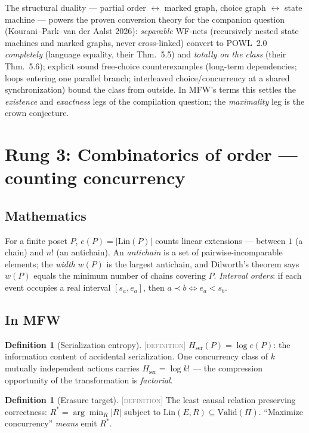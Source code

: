 \documentclass[11pt]{article}
\newcommand{\DEFINITION}{\textcolor{gray}{\textsc{[definition]}}}
\newcommand{\PT}{\Pi}
\newcommand{\Lin}{\mathrm{Lin}}
\newcommand{\Hser}{H_{\mathrm{ser}}}
\theoremstyle{plain}
\theoremstyle{definition}
\newtheorem{definition}[theorem]{Definition}
\theoremstyle{remark}
\begin{document}
The structural duality --- partial order $\leftrightarrow$ marked graph,
choice graph $\leftrightarrow$ state machine --- powers the proven
conversion theory for the companion question (Kourani--Park--van der
Aalst 2026): \emph{separable} WF-nets (recursively nested state machines
and marked graphs, never cross-linked) convert to POWL~2.0
\emph{completely} (language equality, their Thm.~5.5) and \emph{totally on
the class} (their Thm.~5.6); explicit sound free-choice counterexamples
(long-term dependencies; loops entering one parallel branch; interleaved
choice/concurrency at a shared synchronization) bound the class from
outside. In MFW's terms this settles the \emph{existence} and
\emph{exactness} legs of the compilation question; the \emph{maximality}
leg is the crown conjecture.

\section{Rung 3: Combinatorics of order --- counting concurrency}
\label{sec:rung3}

\subsection{Mathematics}
For a finite poset $P$, $e(P) = |\Lin(P)|$ counts linear extensions ---
between $1$ (a chain) and $n!$ (an antichain). An \emph{antichain} is a set
of pairwise-incomparable elements; the \emph{width} $w(P)$ is the largest
antichain, and Dilworth's theorem says $w(P)$ equals the minimum number of
chains covering $P$. \emph{Interval orders}: if each event occupies a real
interval $[s_a, e_a]$, then $a \prec b \iff e_a < s_b$.

\subsection{In MFW}
\begin{definition}[Serialization entropy]\DEFINITION\;
$\Hser(P) = \log e(P)$: the information content of accidental
serialization. One concurrency class of $k$ mutually independent actions
carries $\Hser = \log k!$ --- the compression opportunity of the
transformation is \emph{factorial}.
\end{definition}

\begin{definition}[Erasure target]\DEFINITION\;
The least causal relation preserving correctness:
$R^{*} = \arg\min_R |R|$ subject to $\Lin(E, R) \subseteq
\mathrm{Valid}(\PT)$. ``Maximize concurrency'' \emph{means} emit $R^{*}$.
\end{definition}
\end{document}
